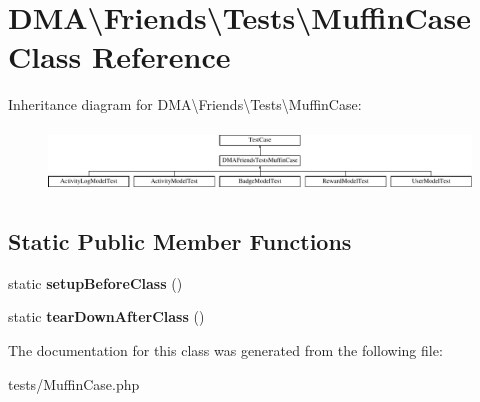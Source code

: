 \hypertarget{classDMA_1_1Friends_1_1Tests_1_1MuffinCase}{\section{D\-M\-A\textbackslash{}Friends\textbackslash{}Tests\textbackslash{}Muffin\-Case Class Reference}
\label{classDMA_1_1Friends_1_1Tests_1_1MuffinCase}
}
Inheritance diagram for D\-M\-A\textbackslash{}Friends\textbackslash{}Tests\textbackslash{}Muffin\-Case\-:\begin{figure}[H]
\begin{center}
\leavevmode
\includegraphics[height=1.696970cm]{d5/d5a/classDMA_1_1Friends_1_1Tests_1_1MuffinCase}
\end{center}
\end{figure}
\subsection*{Static Public Member Functions}
\begin{DoxyCompactItemize}
\item 
\hypertarget{classDMA_1_1Friends_1_1Tests_1_1MuffinCase_a6a7db54c072ac30c545ab15c3e4310b7}{static {\bfseries setup\-Before\-Class} ()}\label{classDMA_1_1Friends_1_1Tests_1_1MuffinCase_a6a7db54c072ac30c545ab15c3e4310b7}

\item 
\hypertarget{classDMA_1_1Friends_1_1Tests_1_1MuffinCase_a8139d79ba97f35cc332f168f741ce5f6}{static {\bfseries tear\-Down\-After\-Class} ()}\label{classDMA_1_1Friends_1_1Tests_1_1MuffinCase_a8139d79ba97f35cc332f168f741ce5f6}

\end{DoxyCompactItemize}


The documentation for this class was generated from the following file\-:\begin{DoxyCompactItemize}
\item 
tests/Muffin\-Case.\-php\end{DoxyCompactItemize}
